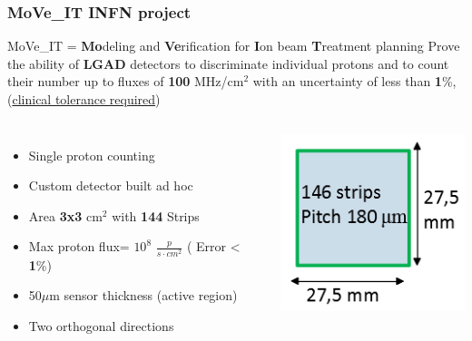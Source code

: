 \documentclass[aspectratio=169]{beamer}
\begin{document}
	\begin{frame}
	\frametitle{MoVe\_IT INFN project}
	\begin{center}
		{\Large \color{blue} MoVe\_IT = \textbf{Mo}deling and \textbf{Ve}rification for \textbf{I}on beam \textbf{T}reatment planning }
		\newline
		Prove the ability of \textbf{LGAD} detectors to discriminate individual protons and to count their number up to fluxes of \textbf{100} MHz/cm$^2$ with an uncertainty of {\color{blue}less than \textbf{1}\%}, (\underline{clinical tolerance required})
	\end{center}
	\begin{columns}
		\begin{itemize}
			\item Single proton counting
			\item Custom detector built ad hoc
			\item Area \textbf{3x3} cm${}^2$ with \textbf{144} Strips
			\item Max proton flux= $10^8$ $\frac{p}{s \cdot cm^2}$ ({\color{blue} Error < \textbf{1}\%})
			\item 50$\mu$m sensor thickness (active region)
			\item Two orthogonal directions
		\end{itemize}
		\begin{center}
			\includegraphics[width=0.7 \textwidth]{IMG/Detector.PNG}
		\end{center}
	\end{columns}
	\end{frame}
\end{document}
